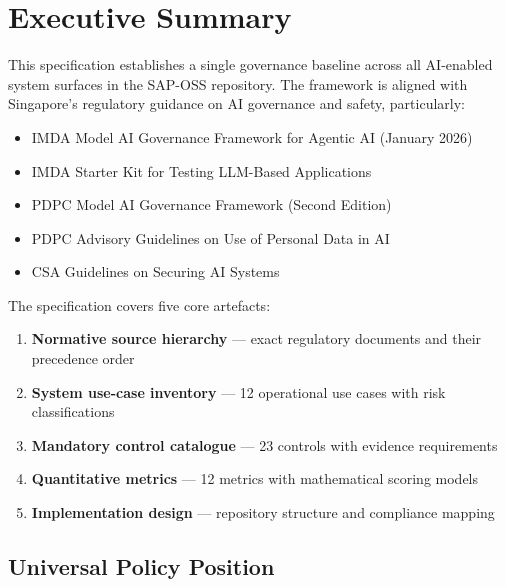 
\chapter*{Executive Summary}

This specification establishes a single governance baseline across all AI-enabled
system surfaces in the SAP-OSS repository. The framework is aligned with
Singapore's regulatory guidance on AI governance and safety, particularly:

\begin{itemize}
  \item IMDA Model AI Governance Framework for Agentic AI (January 2026)
  \item IMDA Starter Kit for Testing LLM-Based Applications
  \item PDPC Model AI Governance Framework (Second Edition)
  \item PDPC Advisory Guidelines on Use of Personal Data in AI
  \item CSA Guidelines on Securing AI Systems
\end{itemize}

The specification covers five core artefacts:

\begin{enumerate}
  \item \textbf{Normative source hierarchy} --- exact regulatory documents and
        their precedence order
  \item \textbf{System use-case inventory} --- 12 operational use cases with
        risk classifications
  \item \textbf{Mandatory control catalogue} --- 23 controls with evidence
        requirements
  \item \textbf{Quantitative metrics} --- 12 metrics with mathematical scoring
        models
  \item \textbf{Implementation design} --- repository structure and compliance
        mapping
\end{enumerate}

\section*{Universal Policy Position}

